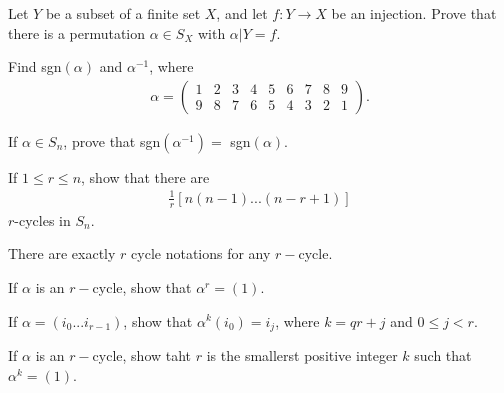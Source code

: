\documentclass[12pt]{article}
\newenvironment{exercise}[2][Exercise]{\begin{trivlist}
\item[\hskip \labelsep {\bfseries #1}\hskip \labelsep {\bfseries #2.}]}
{\end{trivlist}}
\newenvironment{hint}[2][Hint]{\begin{trivlist}
    \item[\hskip \labelsep {\bfseries #1}\hskip \labelsep {\bfseries #2.}]}
    {\end{trivlist}}
\begin{document}
\begin{exercise}{1.9}

    Let $Y$ be a subset of a finite set $X$, and let $f:Y\rightarrow X$ be an injection. Prove that there is a permutation $\alpha \in S_X$ with $\alpha |Y =f$.

    
\end{exercise}


\begin{exercise}{1.10}

    Find sgn$(\alpha)$ and $\alpha^{-1}$, where 
    \begin{align*}
        \alpha = \begin{pmatrix}
            1&2&3&4&5&6&7&8&9\\9&8&7&6&5&4&3&2&1
        \end{pmatrix}.
    \end{align*}
    
\end{exercise}


\begin{exercise}{1.11}

    If $\alpha\in S_n$, prove that sgn$(\alpha^{-1}) =$ sgn$(\alpha)$.
    
\end{exercise}



\begin{exercise}{1.12}

    If $1\leq r \leq n$, show that there are 
    \begin{align*}
        \frac{1}r [n(n-1)...(n-r+1)]
    \end{align*} 
    $r$-cycles in $S_n$.

    \begin{hint}{}
        There are exactly $r$ cycle notations for any $r-$cycle.
    \end{hint}

\end{exercise}

\begin{exercise}{1.13}

    \begin{enumerate}
        \item[(i)] If $\alpha$ is an $r-$cycle, show that $\alpha^r =(1)$.
        \begin{hint}{}
            If $\alpha=(i_0...i_{r-1})$, show that $\alpha^k(i_0) = i_j$, where $k=qr+j$ and $0\leq j < r$.
        \end{hint}
        \item[(ii)] If $\alpha$ is an $r-$cycle, show taht $r$ is the smallerst positive integer $k$ such that $\alpha^k=(1)$.
    \end{enumerate}

\end{exercise}
\end{document}
